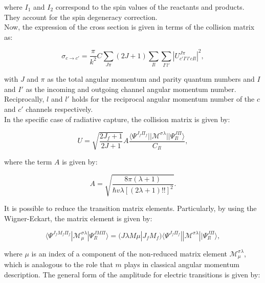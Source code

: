 \documentclass[openany]{book}
\begin{document}
where $I_1$ and $I_2$ correspond to the spin values of the reactants and products. They account for the spin degeneracy correction. \\

Now, the expression of the cross section is given in terms of the collision matrix as:

\begin{equation}\label{rmatrix_crossSection_ccprime}
	\sigma_{c\rightarrow c'} = \frac{\pi}{k^2} C \sum_{J\pi} {(2J +1) \sum_{Il} \sum_{I'l'} |U^{J\pi}_{c'I'l'cIl}|^2},
\end{equation}

with $J$ and $\pi$ as the total angular momentum and parity quantum numbers and $I$ and $I'$ as the incoming and outgoing channel angular momentum number. Reciprocally, $l$ and $l'$ holds for the reciprocal angular momentum number of the $c$ and $c'$ channels respectively.\\

In the specific case of radiative capture, the collision matrix is given by: 

\begin{equation}\label{rmatrix_radiativeCapture_U}
	U = \sqrt{\frac{2J_f + 1}{2J + 1}} A \frac{\langle \Psi^{J_f\Pi_f} || \mathcal{M}^{\sigma \lambda} ||  \Psi^{J \Pi}_{Il} \rangle }{C_{Il}},
\end{equation}

where the term $A$ is given by:

\begin{equation}\label{rmatrix_radiativeCapture_A}
	A = \sqrt{\frac{8\pi(\lambda + 1)}{\hbar v \lambda [(2\lambda + 1)!!]^2}}.
\end{equation}

It is possible to reduce the transition matrix elements. Particularly, by using the Wigner-Eckart, the matrix element is given by:

\begin{equation}\label{rmatrix_radiativeCapture_transitionMatrix}
	\langle \Psi^{J_fM_f\Pi_f} | \mathcal{M}^{\sigma \lambda}_\mu |  \Psi^{J M \Pi}_{Il} \rangle = (J\lambda M \mu | J_fM_f) \langle \Psi^{J_f\Pi_f} || \mathcal{M}^{\sigma \lambda} ||  \Psi^{J \Pi}_{Il} \rangle,
\end{equation}

where $\mu$ is an index of a component of the non-reduced matrix element $\mathcal{M}^{\sigma \lambda}_{\mu}$, which is analogous to the role that $m$ plays in classical angular momentum description. The general form of the amplitude for electric transitions is given by: 
\end{document}
